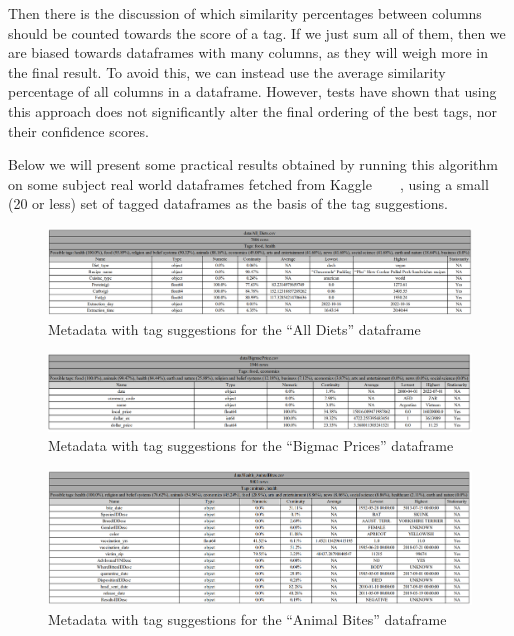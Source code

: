 Then there is the discussion of which similarity percentages between columns should be counted towards the score of a tag.
If we just sum all of them, then we are biased towards dataframes with many columns, as they will weigh more in the final
result.
To avoid this, we can instead use the average similarity percentage of all columns in a dataframe.
However, tests have shown that using this approach does not significantly alter the final ordering of the best tags, nor
their confidence scores.

Below we will present some practical results obtained by running this algorithm on some subject real world dataframes fetched
from Kaggle~~~~\cite{kaggleHealthAnimalBites,kaggleBigmacPrices,kaggleAllDiets,kaggleRamenRatings}, using a small (20 or less)
set of tagged dataframes as the basis of the tag suggestions.

\begin{figure}[h]
    \centering
    \includegraphics[width=12cm]{figures/tag_suggestions/all_diets_tags}
    \caption{Metadata with tag suggestions for the ``All Diets'' dataframe}
    \label{fig:all_diets_tags}
\end{figure}

\begin{figure}[h]
    \centering
    \includegraphics[width=12cm]{figures/tag_suggestions/bigmac_price_tags}
    \caption{Metadata with tag suggestions for the ``Bigmac Prices'' dataframe}
    \label{fig:bigmac_price_tags}
\end{figure}

\begin{figure}[h]
    \centering
    \includegraphics[width=12cm]{figures/tag_suggestions/health_animal_bites_tags}
    \caption{Metadata with tag suggestions for the ``Animal Bites'' dataframe}
    \label{fig:animal_bites_tags}
\end{figure}


